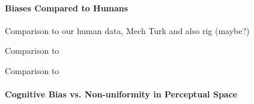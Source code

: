 \paragraph{Biases Compared to Humans}

Comparison to our human data, Mech Turk and also rig (maybe?)

Comparison to \cite{bae_why_2015}

Comparison to \cite{panichello_error-correcting_2019}

\paragraph{Cognitive Bias vs. Non-uniformity in Perceptual Space}

\begin{figure}
    \centering
    \begin{subfigure}[b]{0.49\textwidth}
         \centering
         \caption{}
        
         \label{fig:JustBias}
    \end{subfigure}
    \hfill
    \begin{subfigure}[b]{0.49\textwidth}
         \centering
         \caption{}
         
         \label{fig:JustColSpace}
    \end{subfigure}


\end{figure}
